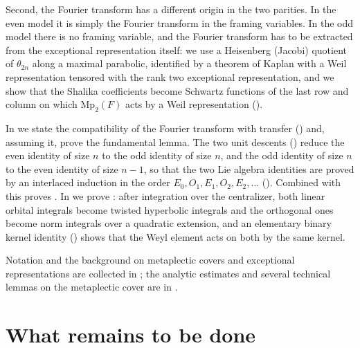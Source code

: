 \documentclass[11pt,oneside,notitlepage]{book}
\numberwithin{equation}{section}
\theoremstyle{plain}
\theoremstyle{definition}
\newcommand{\Mp}{\mathrm{Mp}}
\begin{document}
Second, the Fourier transform has a different origin in the two parities. In the even model it is simply the Fourier transform in the framing variables. In the odd model there is no framing variable, and the Fourier transform has to be extracted from the exceptional representation itself: we use a Heisenberg (Jacobi) quotient of $\theta_{2n}$ along a maximal parabolic, identified by a theorem of Kaplan with a Weil representation tensored with the rank two exceptional representation, and we show that the Shalika coefficients become Schwartz functions of the last row and column on which $\Mp_2(F)$ acts by a Weil representation ().

In  we state the compatibility of the Fourier transform with transfer () and, assuming it, prove the fundamental lemma. The two unit descents () reduce the even identity of size $n$ to the odd identity of size $n$, and the odd identity of size $n$ to the even identity of size $n-1$, so that the two Lie algebra identities are proved by an interlaced induction in the order $E_0,O_1,E_1,O_2,E_2,\dots$ (). Combined with  this proves . In  we prove : after integration over the centralizer, both linear orbital integrals become twisted hyperbolic integrals and the orthogonal ones become norm integrals over a quadratic extension, and an elementary binary kernel identity () shows that the Weyl element acts on both by the same kernel. 

Notation and the background on metaplectic covers and exceptional representations are collected in ; the analytic estimates and several technical lemmas on the metaplectic cover are in .

\section{What remains to be done}
\end{document}
